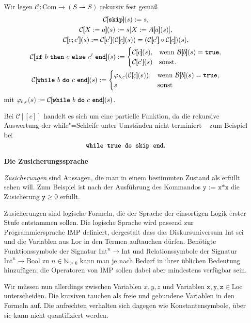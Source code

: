 \documentclass[8pt,fleqn,aspectratio=169]{beamer}
\newcommand{\strong}[1]{\textsf{\textbf{#1}}}
\newcommand{\centerheadline}[1]{%
  \begin{center}\strong{#1}\end{center}}
\newcommand{\parspace}{\vspace{0.8em}}
\newcommand{\kw}[1]{\textbf{\texttt{#1}}}
\newcommand{\code}[1]{{\texttt{#1}}}
\newcommand{\qb}[1]{[\!\![#1]\!\!]}
\newcommand{\Bool}{\mathrm{Bool}}
\newcommand{\Int}{\mathrm{Int}}
\newcommand{\Loc}{\mathrm{Loc}}
\newcommand{\Com}{\mathrm{Com}}
\newcommand{\evB}{\mathcal B}
\newcommand{\evC}{\mathcal C}
\newcommand{\N}{\mathbb N}
\begin{document}
\begin{frame}
Wir legen $\evC\colon\Com\to (S\rightharpoonup S)$ rekursiv fest gemäß
\begin{gather*}
\evC\qb{\kw{skip}}(s) := s,\\
\evC\qb{X:=a}(s) := s[X:=A\qb{a}(s)],\\
\evC\qb{c; c'}(s) := \evC\qb{c'}(\evC\qb{c}(s)) = (\evC\qb{c'}\circ \evC\qb{c})(s),\\
\evC\qb{\text{\kw{if} $b$ \kw{then} $c$ \kw{else} $c'$ \kw{end}}}(s) := \begin{cases}
\evC\qb{c}(s),& \text{wenn $\evB\qb{b}(s)=\kw{true}$},\\
\evC\qb{c'}(s)& \text{sonst}.
\end{cases}\\
\evC\qb{\text{\kw{while} $b$ \kw{do} $c$ \kw{end}}}(s) := \begin{cases}
\varphi_{b,c}(\evC\qb{c}(s)),& \text{wenn $\evB\qb{b}(s)=\kw{true}$},\\
s & \text{sonst}
\end{cases}
\end{gather*}
mit $\varphi_{b,c}(s) := \evC\qb{\text{\kw{while} $b$ \kw{do} $c$ \kw{end}}}(s)$.\pause

\parspace
Bei $\evC\qb{c}$ handelt es sich um eine partielle Funktion, da die rekursive Auswertung
der while"=Schleife unter Umständen nicht terminiert -- zum Beispiel bei
\[\texttt{\kw{while} \kw{true} \kw{do} \kw{skip} \kw{end}}.\]
\end{frame}

\begin{frame}
\centerheadline{Die Zusicherungssprache}
\end{frame}

\begin{frame}
\emph{Zusicherungen} sind Aussagen, die man in einem bestimmten Zustand als
erfüllt sehen will. Zum Beispiel ist nach der Ausführung des Kommandos
$\code{y := x*x}$ die Zusicherung $\code{y}\ge 0$
erfüllt.\pause

\parspace
Zusicherungen sind logische Formeln, die der Sprache der einsortigen Logik
erster Stufe entstammen sollen. Die logische Sprache wird passend zur
Programmiersprache IMP definiert, dergestalt dass das Diskursuniversum
$\Int$ sei und die Variablen aus $\Loc$ in den Termen auftauchen dürfen.
Benötigte Funktionssymbole der Signatur $\Int^n\to\Int$ und
Relationssymbole der Signatur $\Int^n\to\Bool$ zu $n\in\N_{\ge 0}$ kann man
je nach Bedarf in ihrer üblichen Bedeutung hinzufügen; die Operatoren
von IMP sollen dabei aber mindestens verfügbar sein.\pause

\parspace
Wir müssen nun allerdings zwischen Variablen $x,y,z$ und Variablen
$\code{x},\code{y},\code{z}\in\Loc$ unterscheiden. Die kursiven tauchen
als freie und gebundene Variablen in den Formeln auf. Die aufrechten
verhalten sich dagegen wie Konstantensymbole, über sie kann nicht
quantifiziert werden.
\end{frame}
\end{document}
